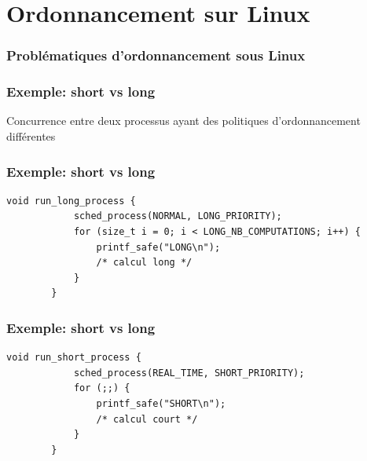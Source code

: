\documentclass{beamer}
\begin{document}
\section{Ordonnancement sur Linux}

\begin{frame}
    \frametitle{Problématiques d'ordonnancement sous Linux}

\end{frame}

\begin{frame}
    \frametitle{Exemple: short vs long}

    \begin{center}
        \huge
        Concurrence entre deux processus ayant des politiques d'ordonnancement
        différentes
    \end{center}
\end{frame}

\begin{frame}[fragile]
    \frametitle{Exemple: short vs long}

    \begin{lstlisting}[caption=processus long]
        void run_long_process {
            sched_process(NORMAL, LONG_PRIORITY);
            for (size_t i = 0; i < LONG_NB_COMPUTATIONS; i++) {
                printf_safe("LONG\n");
                /* calcul long */
            }
        }
    \end{lstlisting}
\end{frame}

\begin{frame}[fragile]
    \frametitle{Exemple: short vs long}

    \begin{lstlisting}[caption=processus court]
        void run_short_process {
            sched_process(REAL_TIME, SHORT_PRIORITY);
            for (;;) {
                printf_safe("SHORT\n");
                /* calcul court */
            }
        }
    \end{lstlisting}
\end{frame}
\end{document}
